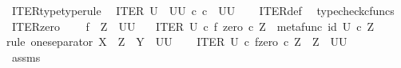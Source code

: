 \begin{isabellebody}
\isanewline
{}\isamarkupfalse%
\ ITER{\isacharunderscore}{\kern0pt}type{\isacharbrackleft}{\kern0pt}type{\isacharunderscore}{\kern0pt}rule{\isacharbrackright}{\kern0pt}{\isacharcolon}{\kern0pt}\isanewline
\ \ {\isachardoublequoteopen}ITER\ U\ {\isacharcolon}{\kern0pt}\ {\isacharparenleft}{\kern0pt}{\isacharparenleft}{\kern0pt}U\isactrlbsup U\isactrlesup {\isacharparenright}{\kern0pt}\ {\isasymtimes}\isactrlsub c\ {\isasymnat}\isactrlsub c{\isacharparenright}{\kern0pt}\ {\isasymrightarrow}\ {\isacharparenleft}{\kern0pt}U\isactrlbsup U\isactrlesup {\isacharparenright}{\kern0pt}{\isachardoublequoteclose}\isanewline
%
\isadelimproof
\ \ %
\endisadelimproof
%
\isatagproof
{}\isamarkupfalse%
\ ITER{\isacharunderscore}{\kern0pt}def\ \isamarkupfalse%
\ typecheck{\isacharunderscore}{\kern0pt}cfuncs%
\endisatagproof
{\isafoldproof}%
%
\isadelimproof
\isanewline
%
\endisadelimproof
\isanewline
{}\isamarkupfalse%
\ ITER{\isacharunderscore}{\kern0pt}zero{\isacharcolon}{\kern0pt}\ \isanewline
\ \ \ {\isachardoublequoteopen}f\ {\isacharcolon}{\kern0pt}\ Z\ {\isasymrightarrow}\ {\isacharparenleft}{\kern0pt}U\isactrlbsup U\isactrlesup {\isacharparenright}{\kern0pt}{\isachardoublequoteclose}\isanewline
\ \ \ {\isachardoublequoteopen}ITER\ U\ {\isasymcirc}\isactrlsub c\ {\isasymlangle}f{\isacharcomma}{\kern0pt}\ zero\ {\isasymcirc}\isactrlsub c\ {\isasymbeta}\isactrlbsub Z\isactrlesub {\isasymrangle}\ {\isacharequal}{\kern0pt}\ metafunc\ {\isacharparenleft}{\kern0pt}id\ U{\isacharparenright}{\kern0pt}\ {\isasymcirc}\isactrlsub c\ {\isasymbeta}\isactrlbsub Z\isactrlesub {\isachardoublequoteclose}\isanewline
%
\isadelimproof
%
\endisadelimproof
%
\isatagproof
{}\isamarkupfalse%
{\isacharparenleft}{\kern0pt}rule\ one{\isacharunderscore}{\kern0pt}separator{\isacharbrackleft}{\kern0pt}\ X\ {\isacharequal}{\kern0pt}\ Z{\isacharcomma}{\kern0pt}\ \ Y\ {\isacharequal}{\kern0pt}\ {\isachardoublequoteopen}U\isactrlbsup U\isactrlesup {\isachardoublequoteclose}{\isacharbrackright}{\kern0pt}{\isacharparenright}{\kern0pt}\isanewline
\ \ \isamarkupfalse%
\ {\isachardoublequoteopen}ITER\ U\ {\isasymcirc}\isactrlsub c\ {\isasymlangle}f{\isacharcomma}{\kern0pt}zero\ {\isasymcirc}\isactrlsub c\ {\isasymbeta}\isactrlbsub Z\isactrlesub {\isasymrangle}\ {\isacharcolon}{\kern0pt}\ Z\ {\isasymrightarrow}\ U\isactrlbsup U\isactrlesup {\isachardoublequoteclose}\isanewline
\ \ \ \ \isamarkupfalse%
\ assms\ \isamarkupfalse%

\end{isabellebody}
